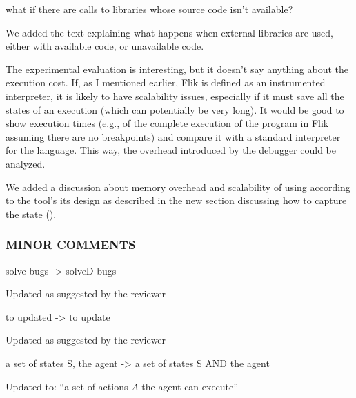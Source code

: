 \begin{remark} \label{rem:python-lib}
what if there are calls to libraries whose source code isn't available?
\end{remark}
\begin{solved}
We added the text explaining what happens when external libraries are used, either with available code, or unavailable code.
\end{solved}

\begin{remark} \label{rem:scalability}
The experimental evaluation is interesting, but it doesn't say anything about the execution cost. If, as I mentioned earlier, Flik is defined as an instrumented interpreter, it is likely to have scalability issues, especially if it must save all the states of an execution (which can potentially be very long). It would be good to show execution times (e.g., of the complete execution of the program in Flik assuming there are no breakpoints) and compare it with a standard interpreter for the language. This way, the overhead introduced by the debugger could be analyzed.
\end{remark}
\begin{solved}
We added a discussion about memory overhead and scalability of using \flik according to the tool's its design as described in the new section discussing how to capture the state ().
\end{solved}


\subsubsection{ MINOR COMMENTS}
\begin{remark}
solve bugs -> solveD bugs
\end{remark}
\begin{solved}
Updated as suggested by the reviewer
\end{solved}

\begin{remark}
to updated -> to update
\end{remark}
\begin{solved}
Updated as suggested by the reviewer
\end{solved}

\begin{remark}
a set of states S, the agent -> a set of states S AND the agent
\end{remark}
\begin{solved}
Updated to: ``a set of actions $A$ the agent can execute''
\end{solved}


